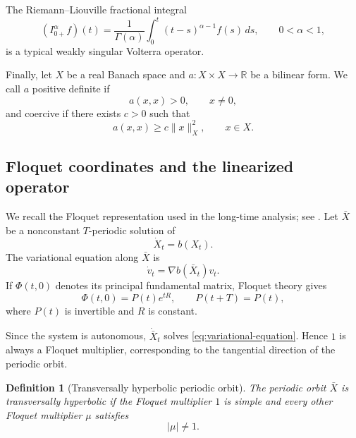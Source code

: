 \documentclass[preprint,12pt]{elsarticle}
\newtheorem{definition}[theorem]{Definition}
\theoremstyle{definition}
\theoremstyle{plain}
\begin{document}
The Riemann--Liouville fractional integral
\begin{equation*}
    (I_{0+}^{\alpha}f)(t)
    =
    \frac{1}{\Gamma(\alpha)}
    \int_0^t
    (t-s)^{\alpha-1}f(s)\,ds,
    \qquad
    0<\alpha<1,
\end{equation*}
is a typical weakly singular Volterra operator.

Finally, let $X$ be a real Banach space and
$a:X\times X\to\mathbb R$ be a bilinear form. We call $a$ positive
definite if
\begin{equation*}
    a(x,x)>0,
    \qquad
    x\neq0,
\end{equation*}
and coercive if there exists $c>0$ such that
\begin{equation*}
    a(x,x)
    \geq
    c\|x\|_X^2,
    \qquad
    x\in X.
\end{equation*}



\subsection{Floquet coordinates and the linearized operator}
\label{subsec:floquet-linearized-operator}

We recall the Floquet representation used in the long-time analysis; see
\cite{perko2001differential}. Let $\bar X$ be a nonconstant $T$-periodic
solution of
\begin{equation*}
    \dot X_t=b(X_t).
\end{equation*}
The variational equation along $\bar X$ is
\begin{equation}
\label{eq:variational-equation}
    \dot v_t=\nabla b(\bar X_t)v_t.
\end{equation}
If $\Phi(t,0)$ denotes its principal fundamental matrix, Floquet theory gives
\begin{equation}
\label{eq:floquet-decomposition}
    \Phi(t,0)=P(t)e^{tR},
    \qquad
    P(t+T)=P(t),
\end{equation}
where $P(t)$ is invertible and $R$ is constant.

Since the system is autonomous, $\dot{\bar X}_t$ solves
\eqref{eq:variational-equation}. Hence $1$ is always a Floquet multiplier,
corresponding to the tangential direction of the periodic orbit.

\begin{definition}[Transversally hyperbolic periodic orbit]
\label{def:transversally-hyperbolic}
The periodic orbit $\bar X$ is transversally hyperbolic if the Floquet
multiplier $1$ is simple and every other Floquet multiplier $\mu$ satisfies
\begin{equation*}
    |\mu|\neq1.
\end{equation*}
\end{definition}
\end{document}
